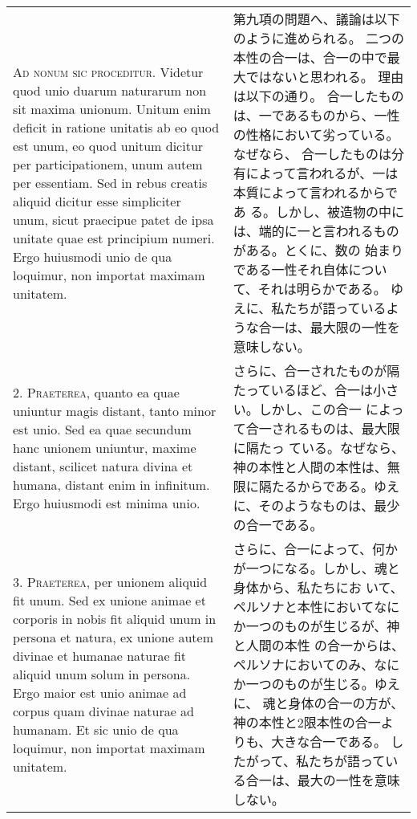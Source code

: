\documentclass[10pt]{jsarticle} %
\begin{document}
\begin{longtable}{p{21em}p{21em}}



{\Huge A}{\scshape d nonum sic proceditur}. Videtur quod unio duarum naturarum non sit
maxima unionum. Unitum enim deficit in ratione unitatis ab eo quod est
unum, eo quod unitum dicitur per participationem, unum autem per
essentiam. Sed in rebus creatis aliquid dicitur esse simpliciter unum,
sicut praecipue patet de ipsa unitate quae est principium numeri. Ergo
huiusmodi unio de qua loquimur, non importat maximam unitatem.


&

第九項の問題へ、議論は以下のように進められる。
二つの本性の合一は、合一の中で最大ではないと思われる。
理由は以下の通り。
合一したものは、一であるものから、一性の性格において劣っている。なぜなら、
 合一したものは分有によって言われるが、一は本質によって言われるからであ
 る。しかし、被造物の中には、端的に一と言われるものがある。とくに、数の
 始まりである一性それ自体について、それは明らかである。
ゆえに、私たちが語っているような合一は、最大限の一性を意味しない。

\\



2. {\scshape Praeterea}, quanto ea quae uniuntur magis distant, tanto minor est
unio. Sed ea quae secundum hanc unionem uniuntur, maxime distant,
scilicet natura divina et humana, distant enim in infinitum. Ergo
huiusmodi est minima unio.


&

さらに、合一されたものが隔たっているほど、合一は小さい。しかし、この合一
 によって合一されるものは、最大限に隔たっ
 ている。なぜなら、神の本性と人間の本性は、無限に隔たるからである。ゆえ
 に、そのようなものは、最少の合一である。


\\



3. {\scshape Praeterea}, per unionem aliquid fit unum. Sed ex unione animae et
corporis in nobis fit aliquid unum in persona et natura, ex unione autem
divinae et humanae naturae fit aliquid unum solum in persona. Ergo maior
est unio animae ad corpus quam divinae naturae ad humanam. Et sic unio
de qua loquimur, non importat maximam unitatem.


&

さらに、合一によって、何かが一つになる。しかし、魂と身体から、私たちにお
 いて、ペルソナと本性においてなにか一つのものが生じるが、神と人間の本性
 の合一からは、ペルソナにおいてのみ、なにか一つのものが生じる。ゆえに、
 魂と身体の合一の方が、神の本性と2限本性の合一よりも、大きな合一である。
 したがって、私たちが語っている合一は、最大の一性を意味しない。



\end{longtable}
\end{document}
